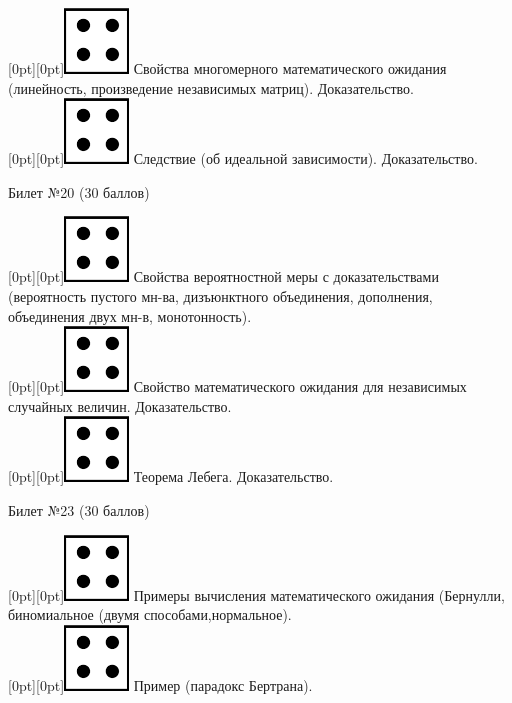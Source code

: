 \documentclass[10pt]{article}
\begin{document}
\raisebox{-1pt}[0pt][0pt]{\includegraphics[width=0.02\linewidth]{4.png}} Свойства многомерного математического ожидания (линейность, произведение независимых матриц). Доказательство. \\ 

\raisebox{-1pt}[0pt][0pt]{\includegraphics[width=0.02\linewidth]{4.png}} Следствие (об идеальной зависимости). Доказательство. \\

\begin{center} {\Large Билет №20 (30 баллов)} \end{center}

\raisebox{-1pt}[0pt][0pt]{\includegraphics[width=0.02\linewidth]{4.png}} Свойства вероятностной меры с доказательствами (вероятность пустого мн-ва, дизъюнктного объединения, дополнения, объединения двух мн-в, монотонность). \\

\raisebox{-1pt}[0pt][0pt]{\includegraphics[width=0.02\linewidth]{4.png}} Свойство  математического ожидания для независимых случайных величин. Доказательство. \\

\raisebox{-1pt}[0pt][0pt]{\includegraphics[width=0.02\linewidth]{4.png}} Теорема Лебега. Доказательство. \\

\begin{center} {\Large Билет №23 (30 баллов)} \end{center}

\raisebox{-1pt}[0pt][0pt]{\includegraphics[width=0.02\linewidth]{4.png}} Примеры вычисления математического ожидания (Бернулли, биномиальное (двумя способами,нормальное). \\

\raisebox{-1pt}[0pt][0pt]{\includegraphics[width=0.02\linewidth]{4.png}} Пример (парадокс Бертрана). \\ 
\end{document}
